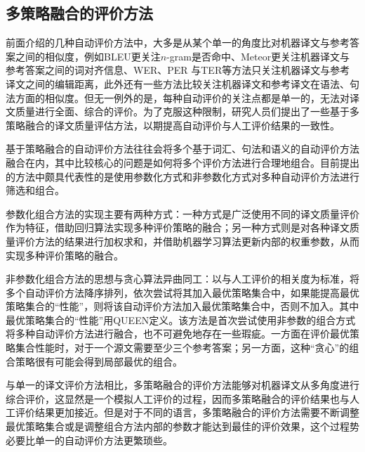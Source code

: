 \subsection{多策略融合的评价方法}\label{Evaluation method of Multi Strategy fusion}

\parinterval 前面介绍的几种自动评价方法中，大多是从某个单一的角度比对机器译文与参考答案之间的相似度，例如BLEU更关注$n$-gram是否命中、Meteor更关注机器译文与参考答案之间的词对齐信息、WER、PER 与TER等方法只关注机器译文与参考译文之间的编辑距离，此外还有一些方法比较关注机器译文和参考译文在语法、句法方面的相似度。但无一例外的是，每种自动评价的关注点都是单一的，无法对译文质量进行全面、综合的评价。为了克服这种限制，研究人员们提出了一些基于多策略融合的译文质量评估方法，以期提高自动评价与人工评价结果的一致性。

\parinterval 基于策略融合的自动评价方法往往会将多个基于词汇、句法和语义的自动评价方法融合在内，其中比较核心的问题是如何将多个评价方法进行合理地组合。目前提出的方法中颇具代表性的是使用参数化方式和非参数化方式对多种自动评价方法进行筛选和组合。

\parinterval 参数化组合方法的实现主要有两种方式：一种方式是广泛使用不同的译文质量评价作为特征，借助回归算法实现多种评价策略的融合；另一种方式则是对各种译文质量评价方法的结果进行加权求和，并借助机器学习算法更新内部的权重参数，从而实现多种评价策略的融合。

\parinterval 非参数化组合方法的思想与贪心算法异曲同工：以与人工评价的相关度为标准，将多个自动评价方法降序排列，依次尝试将其加入最优策略集合中，如果能提高最优策略集合的“性能”，则将该自动评价方法加入最优策略集合中，否则不加入。其中最优策略集合的“性能”用QUEEN定义。该方法是首次尝试使用非参数的组合方式将多种自动评价方法进行融合，也不可避免地存在一些瑕疵。一方面在评价最优策略集合性能时，对于一个源文需要至少三个参考答案；另一方面，这种“贪心”的组合策略很有可能会得到局部最优的组合。

\parinterval 与单一的译文评价方法相比，多策略融合的评价方法能够对机器译文从多角度进行综合评价，这显然是一个模拟人工评价的过程，因而多策略融合的评价结果也与人工评价结果更加接近。但是对于不同的语言，多策略融合的评价方法需要不断调整最优策略集合或是调整组合方法内部的参数才能达到最佳的评价效果，这个过程势必要比单一的自动评价方法更繁琐些。


